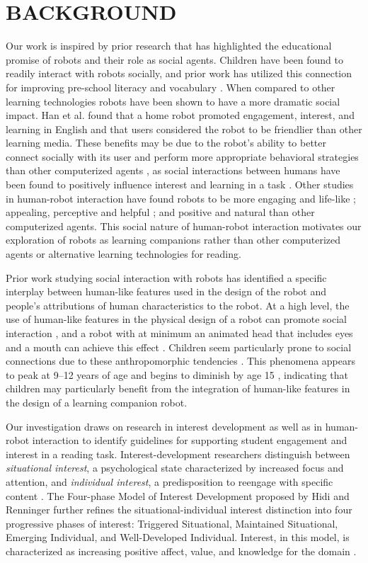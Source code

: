 \documentclass{sigchi}
\begin{document}
\section{BACKGROUND}
Our work is inspired by prior research that has highlighted the educational promise of robots and their role as social agents. {\color{blue}Children have been found to readily interact with robots socially, and prior work has utilized this connection for improving pre-school literacy \cite{Kory:2014} and vocabulary \cite{Spaulding:2016}. When compared to other learning technologies robots have been shown to have a more dramatic social impact. Han et al. \cite{Han:2005} found that a home robot promoted engagement, interest, and learning in English and that users considered the robot to be friendlier than other learning media. }These benefits may be due to the robot's ability to better connect socially with its user and perform more appropriate behavioral strategies than other computerized agents \cite{Brown:2013}, as social interactions between humans have been found to positively influence interest and learning in a task \cite{Sansone:2005}. Other studies in human-robot interaction have found robots to be more engaging and life-like \cite{Kiesler:2008}; appealing, perceptive and helpful \cite{Wainer:2007}; and positive and natural \cite{Bainbridge:2011} than other computerized agents. This social nature of human-robot interaction motivates our exploration of robots as learning companions rather than other computerized agents or alternative learning technologies for reading. 

Prior work studying social interaction with robots has identified a specific interplay between human-like features used in the design of the robot and people's attributions of human characteristics to the robot. At a high level, the use of human-like features in the physical design of a robot can promote social interaction \cite{Duffy:2003}, and a robot with at minimum an animated head that includes eyes and a mouth can achieve this effect \cite{Martini:2015}. Children seem particularly prone to social connections due to these anthropomorphic tendencies \cite{Tung:2016}. This phenomena appears to peak at 9--12 years of age and begins to diminish by age 15 \cite{Kahn:2012}, indicating that children may particularly benefit from the integration of human-like features in the design of a learning companion robot.

Our investigation draws on research in interest development as well as in human-robot interaction to identify guidelines for supporting student engagement and interest in a reading task. Interest-development researchers distinguish between \textit{situational interest}, a psychological state characterized by increased focus and attention, and \textit{individual interest}, a predisposition to reengage with specific content \cite{Krapp:1999}. The Four-phase Model of Interest Development proposed by Hidi and Renninger \cite{Hidi:2006} further refines the situational-individual interest distinction into four progressive phases of interest: Triggered Situational, Maintained Situational, Emerging Individual, and Well-Developed Individual. Interest, in this model, is characterized as increasing positive affect, value, and knowledge for the domain \cite{Renninger:2011}.
\end{document}

